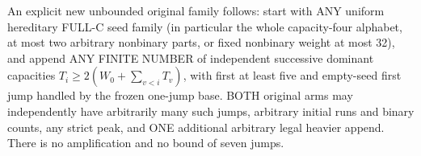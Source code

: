An explicit new unbounded original family follows: start with ANY
uniform hereditary FULL-C seed family (in particular the whole capacity-four
alphabet, at most two arbitrary nonbinary parts, or fixed nonbinary weight
at most 32), and append ANY FINITE NUMBER of independent successive dominant
capacities $T_i\ge2(W_0+\sum_{v<i}T_v)$, with first at least five and
empty-seed first jump handled by the frozen one-jump base. BOTH original arms
may independently have arbitrarily many such jumps, arbitrary initial runs
and binary counts, any strict peak, and ONE additional arbitrary legal
heavier append. There is no amplification and no bound of seven jumps.
